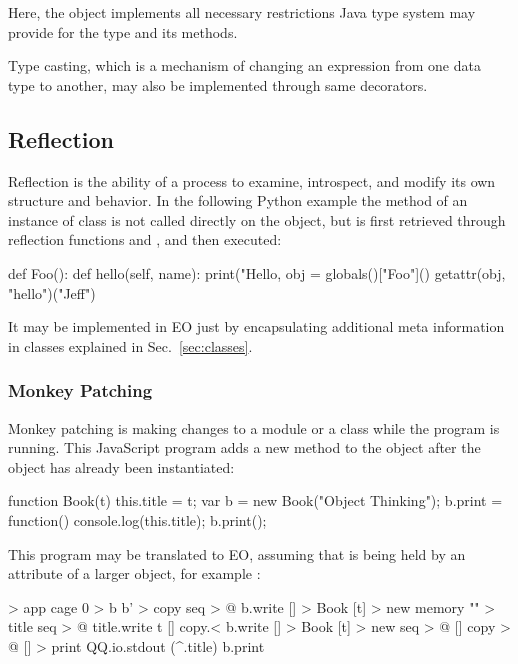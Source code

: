 \documentclass[sigplan,11pt,nonacm,natbib=false]{acmart}
\begin{document}
Here, the  object implements all necessary restrictions Java type system may provide for the type  and its methods.

Type casting, which is a mechanism of changing an expression from one data type to another, may also be implemented through same decorators.

\subsection{Reflection}
\label{sec:reflection}

Reflection is the ability of a process to examine, introspect, and modify its own structure and behavior. In the following Python example the method  of an instance of class  is not called directly on the object, but is first retrieved through reflection functions  and , and then executed:

\begin{ffcode}
def Foo():
    def hello(self, name):
        print("Hello, %
obj = globals()["Foo"]()
getattr(obj, "hello")("Jeff")
\end{ffcode}

It may be implemented in EO just by encapsulating additional meta information in classes explained in Sec.~\ref{sec:classes}.

\subsubsection{Monkey Patching}

Monkey patching is making changes to a module or a class while the program is running. This JavaScript program adds a new method  to the object  after the object has already been instantiated:

\begin{ffcode}
function Book(t) { this.title = t; }
var b = new Book("Object Thinking");
b.print = function() {
  console.log(this.title);
}
b.print();
\end{ffcode}

This program may be translated to EO, assuming that  is being held by an attribute of a larger object, for example :

\begin{ffcode}
[] > app
  cage 0 > b
  b' > copy
  seq > @
    b.write
      [] > Book
        [t] > new
          memory "" > title
          seq > @
            title.write t
            []
    copy.<
    b.write
      [] > Book
        [t] > new
          seq > @
            []
              copy > @
              [] > print
                QQ.io.stdout (^.title)
    b.print
\end{ffcode}
\end{document}
